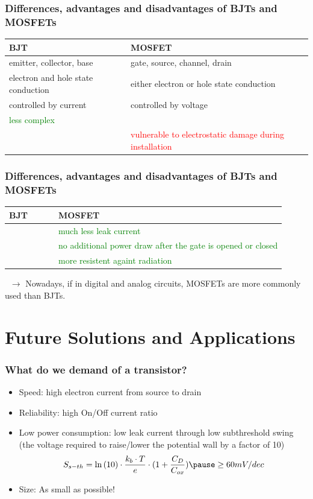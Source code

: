 \documentclass{beamer}
\begin{document}
\begin{frame}\frametitle{Differences, advantages and disadvantages of BJTs and MOSFETs} %
\begin{tabulary}{\linewidth}{L | L}
\textbf{BJT} & \textbf{MOSFET} \\
\hline
emitter, collector, base & gate, source, channel, drain  \\
\hline
electron and hole state conduction & either electron or hole state conduction \\
\hline
controlled by current & controlled by voltage  \\
\hline
\textcolor{green}{less complex} &      \\
\hline
    &  \textcolor{red}{vulnerable to electrostatic damage during installation} \\
\end{tabulary}
\end{frame}

\begin{frame}\frametitle{Differences, advantages and disadvantages of BJTs and MOSFETs} %
\begin{tabulary}{\linewidth}{L | L}
\textbf{BJT} & \textbf{MOSFET} \\
\hline
  $\ \ \ \ \ \ \ \ \ \ \ \ \ \ \ \ \ \ \ \ \ \ $ & \textcolor{green}{much less leak current}  \\
\hline
   & \textcolor{green}{no additional power draw after the gate is opened or closed} \\
\hline
   & \textcolor{green}{more resistent againt radiation}   \\
\hline
\end{tabulary}
$\ $
\newline \newline
$\rightarrow$ Nowadays, if in digital and analog circuits, MOSFETs are more commonly used than BJTs.
\end{frame}

\section{Future Solutions and Applications} 
\begin{frame}\frametitle{What do we demand of a transistor?} 
\begin{itemize}
\pause
\item Speed: high electron current from source to drain
\pause
\item Reliability: high On/Off current ratio
\pause
\item Low power consumption: low leak current through low subthreshold swing (the voltage required to raise/lower the potential wall by a factor of 10)
 \begin{equation*}
 S_{s-th}=\ln{(10)} \cdot \frac{k_b\cdot T}{e}\cdot(1+\frac{C_D}{C_{ox}}) \pause \geq 60mV/dec
 \end{equation*}
\pause
\item Size: As small as possible!
\end{itemize} 
\end{frame}
\end{document}

